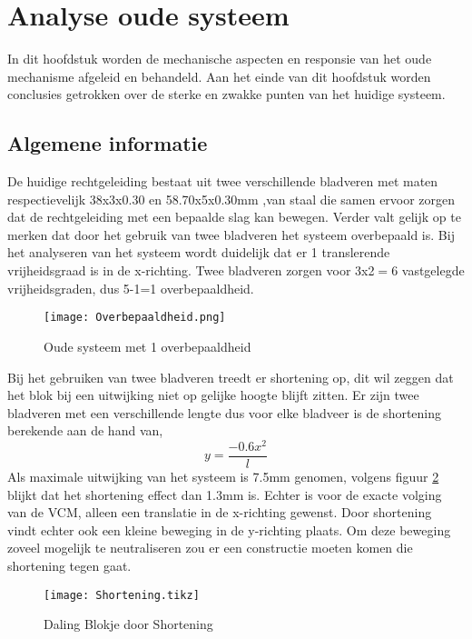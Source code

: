 \documentclass[a4paper]{article}
\begin{document}
\section{Analyse oude systeem}
In dit hoofdstuk worden de mechanische aspecten en responsie van het oude mechanisme afgeleid en behandeld. Aan het einde van dit hoofdstuk worden conclusies getrokken over de sterke en zwakke punten van het huidige systeem.

\subsection{Algemene informatie}
De huidige rechtgeleiding bestaat uit twee verschillende bladveren met maten respectievelijk 38x3x0.30 en 58.70x5x0.30mm ,van staal die samen ervoor zorgen dat de rechtgeleiding met een bepaalde slag kan bewegen. Verder valt gelijk op te merken dat door het gebruik van twee bladveren het systeem overbepaald is. Bij het analyseren van het systeem wordt duidelijk dat er 1  translerende vrijheidsgraad is in de x-richting. Twee bladveren zorgen voor 3x2$=$6 vastgelegde vrijheidsgraden, dus 5-1=1 overbepaaldheid. 

\begin{figure}[h]
\label{Overbepaaldheid}
\centering
\setlength\figureheight{5cm}
\setlength{}
\texttt{[image: Overbepaaldheid.png]}
\caption{Oude systeem met 1 overbepaaldheid}
\end{figure}


Bij het gebruiken van twee bladveren treedt er shortening op, dit wil zeggen dat het blok bij een uitwijking niet op gelijke hoogte blijft zitten. Er zijn twee bladveren met een verschillende lengte dus voor elke bladveer is de shortening berekende aan de hand van,
\begin{equation}
y=\frac{-0.6x^2}{l}
\end{equation}
Als maximale uitwijking van het systeem is 7.5mm genomen, volgens figuur \ref{Shortening} blijkt dat het shortening effect dan 1.3mm is. Echter is voor de exacte volging van de VCM, alleen een translatie in de x-richting gewenst. Door shortening vindt echter ook een kleine beweging in de y-richting plaats. Om deze beweging zoveel mogelijk te neutraliseren zou er een constructie moeten komen die shortening tegen gaat. 
\begin{figure}[h]
\label{Shortening}
\centering
\setlength\figureheight{5cm}
\setlength{}
\texttt{[image: Shortening.tikz]}
\caption{Daling Blokje door Shortening}
\end{figure}
\end{document}
